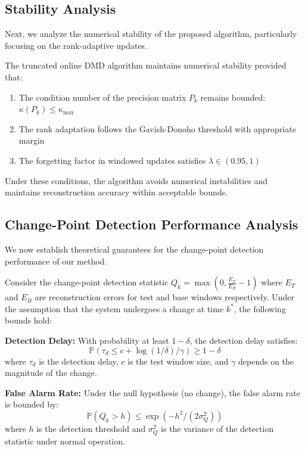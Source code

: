 \subsection{Stability Analysis}

Next, we analyze the numerical stability of the proposed algorithm, particularly focusing on the rank-adaptive updates.

\begin{proposition}\label{prop:stability}
The truncated online DMD algorithm maintains numerical stability provided that:
\begin{enumerate}
    \item The condition number of the precision matrix \(P_k\) remains bounded: \(\kappa(P_k) \leq \kappa_{\max}\)
    \item The rank adaptation follows the Gavish-Donoho threshold with appropriate margin
    \item The forgetting factor in windowed updates satisfies \(\lambda \in (0.95, 1)\)
\end{enumerate}
Under these conditions, the algorithm avoids numerical instabilities and maintains reconstruction accuracy within acceptable bounds.
\end{proposition}

\subsection{Change-Point Detection Performance Analysis}

We now establish theoretical guarantees for the change-point detection performance of our method.

\begin{theorem}\label{thm:detection}
Consider the change-point detection statistic \(Q_k = \max(0, \frac{E_T}{E_B} - 1)\) where \(E_T\) and \(E_B\) are reconstruction errors for test and base windows respectively. Under the assumption that the system undergoes a change at time \(k^*\), the following bounds hold:

\textbf{Detection Delay:} With probability at least \(1-\delta\), the detection delay satisfies:
\[\mathbb{P}(\tau_d \leq c + \log(1/\delta)/\gamma) \geq 1-\delta\]
where \(\tau_d\) is the detection delay, \(c\) is the test window size, and \(\gamma\) depends on the magnitude of the change.

\textbf{False Alarm Rate:} Under the null hypothesis (no change), the false alarm rate is bounded by:
\[\mathbb{P}(Q_k > h) \leq \exp(-h^2/(2\sigma_Q^2))\]
where \(h\) is the detection threshold and \(\sigma_Q^2\) is the variance of the detection statistic under normal operation.
\end{theorem}

